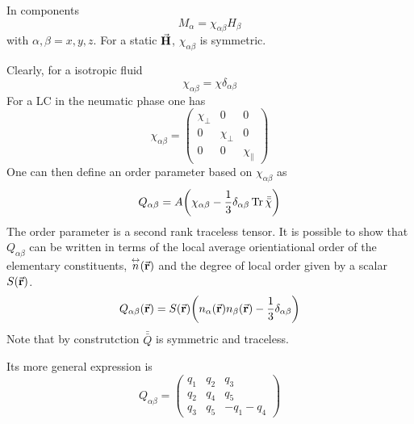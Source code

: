 \documentclass[../main/main.tex]{subfiles}
\begin{document}
In components
\begin{equation}
  M_ \alpha = \chi _{\alpha \beta } H _{\beta }
\end{equation}
with \( \alpha ,\beta =x,y,z \). For a static \( \va{H} \), \( \chi _{\alpha \beta } \) is symmetric.

 Clearly, for a isotropic fluid
\begin{equation}
  \chi _{\alpha \beta } = \chi  \delta _{\alpha \beta }
\end{equation}
For a LC in the neumatic phase one has
\begin{equation}
  \chi _{\alpha \beta } =
  \begin{pmatrix}
  \chi _\bot   &  0 & 0 \\
    0 &  \chi _ \bot & 0 \\
    0 &  0 &  \chi _\parallel
  \end{pmatrix}
\end{equation}
One can then define an order parameter based on \( \chi _{\alpha \beta } \) as
\begin{equation}
  Q_{\alpha \beta } = A \qty(\chi _{\alpha \beta } - \frac{1}{3} \delta _{\alpha \beta }\Tr \bar{\bar{\chi } }  )
\end{equation}
The order parameter is a second rank traceless tensor. It is possible to show that \(   Q_{\alpha \beta }  \) can be written in terms of the local average orientiational order of the elementary constituents, \(  \overset{\leftrightarrow}{n} (\va{r}) \) and the degree of local order given by a scalar \( S(\va{r}) \).
\begin{equation}
  Q_{\alpha \beta } (\va{r}) = S (\va{r}) \qty(n_{\alpha } (\va{r}) n_{\beta } (\va{r}) - \frac{1}{3}\delta _{\alpha \beta })
\end{equation}
Note that by construtction \( \bar{\bar{Q} }  \) is symmetric and traceless.

Its more general expression is
\begin{equation}
  Q_{\alpha \beta } =
  \begin{pmatrix}
  q_1   & q_2  & q_3 \\
  q_2   & q_4  & q_5 \\
  q_3   & q_5  & -q_1-q_4
  \end{pmatrix}
\end{equation}
\end{document}
